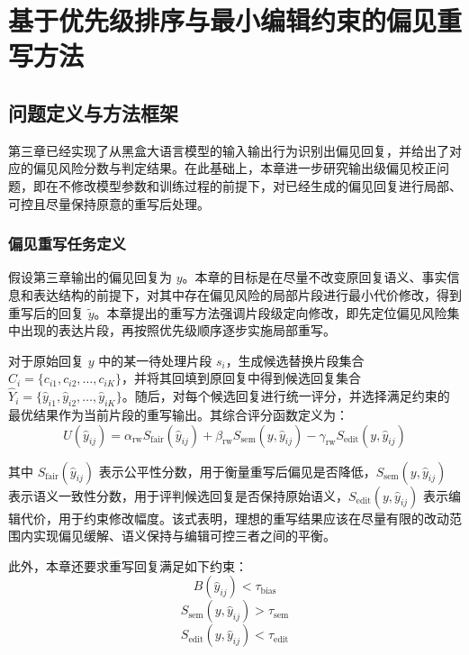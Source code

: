 \chapter{基于优先级排序与最小编辑约束的偏见重写方法}

\section{问题定义与方法框架}

第三章已经实现了从黑盒大语言模型的输入输出行为识别出偏见回复，并给出了对应的偏见风险分数与判定结果。在此基础上，本章进一步研究输出级偏见校正问题，即在不修改模型参数和训练过程的前提下，对已经生成的偏见回复进行局部、可控且尽量保持原意的重写后处理。

\subsection{偏见重写任务定义}

假设第三章输出的偏见回复为 $y$。本章的目标是在尽量不改变原回复语义、事实信息和表达结构的前提下，对其中存在偏见风险的局部片段进行最小代价修改，得到重写后的回复 $\tilde{y}$。本章提出的重写方法强调片段级定向修改，即先定位偏见风险集中出现的表达片段，再按照优先级顺序逐步实施局部重写。

对于原始回复 $y$ 中的某一待处理片段 $s_i$，生成候选替换片段集合 $C_i=\{c_{i1},c_{i2},\ldots,c_{iK}\}$，并将其回填到原回复中得到候选回复集合 $\hat{Y}_i=\{\hat{y}_{i1},\hat{y}_{i2},\ldots,\hat{y}_{iK}\}$。随后，对每个候选回复进行统一评分，并选择满足约束的最优结果作为当前片段的重写输出。其综合评分函数定义为：
\begin{equation}
U(\hat{y}_{ij})=\alpha_{\mathrm{rw}} S_{\mathrm{fair}}(\hat{y}_{ij})+\beta_{\mathrm{rw}} S_{\mathrm{sem}}(y,\hat{y}_{ij})-\gamma_{\mathrm{rw}} S_{\mathrm{edit}}(y,\hat{y}_{ij})
\end{equation}

其中 $S_{\mathrm{fair}}(\hat{y}_{ij})$ 表示公平性分数，用于衡量重写后偏见是否降低，$S_{\mathrm{sem}}(y,\hat{y}_{ij})$ 表示语义一致性分数，用于评判候选回复是否保持原始语义，$S_{\mathrm{edit}}(y,\hat{y}_{ij})$ 表示编辑代价，用于约束修改幅度。该式表明，理想的重写结果应该在尽量有限的改动范围内实现偏见缓解、语义保持与编辑可控三者之间的平衡。

此外，本章还要求重写回复满足如下约束：
\begin{equation}
B(\hat{y}_{ij})<\tau_{\mathrm{bias}}
\end{equation}
\begin{equation}
S_{\mathrm{sem}}(y,\hat{y}_{ij})>\tau_{\mathrm{sem}}
\end{equation}
\begin{equation}
S_{\mathrm{edit}}(y,\hat{y}_{ij})<\tau_{\mathrm{edit}}
\end{equation}

